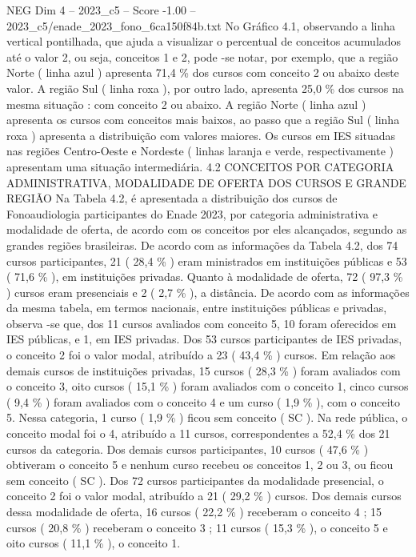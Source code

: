 \begin{textsample}{NEG Dim 4 – 2023\_c5 – Score -1.00 – 2023\_c5/enade\_2023\_fono\_6ca150f84b.txt}
No Gráfico 4.1, observando a linha vertical pontilhada, que ajuda a visualizar o percentual de conceitos acumulados até o valor 2, ou seja, conceitos 1 e 2, pode -se notar, por exemplo, que a região Norte ( linha azul ) apresenta 71,4 \% dos cursos com conceito 2 ou abaixo deste valor.
A região Sul ( linha roxa ), por outro lado, apresenta 25,0 \% dos cursos na mesma situação : com conceito 2 ou abaixo.
A região Norte ( linha azul ) apresenta os cursos com conceitos mais baixos, ao passo que a região Sul ( linha roxa ) apresenta a distribuição com valores maiores.
Os cursos em IES situadas nas regiões Centro-Oeste e Nordeste ( linhas laranja e verde, respectivamente ) apresentam uma situação intermediária. 4.2 CONCEITOS POR CATEGORIA ADMINISTRATIVA, MODALIDADE DE OFERTA DOS CURSOS E GRANDE REGIÃO Na Tabela 4.2, é apresentada a distribuição dos cursos de Fonoaudiologia participantes do Enade 2023, por categoria administrativa e modalidade de oferta, de acordo com os conceitos por eles alcançados, segundo as grandes regiões brasileiras.
De acordo com as informações da Tabela 4.2, dos 74 cursos participantes, 21 ( 28,4 \% ) eram ministrados em instituições públicas e 53 ( 71,6 \% ), em instituições privadas.
Quanto à modalidade de oferta, 72 ( 97,3 \% ) cursos eram presenciais e 2 ( 2,7 \% ), a distância.
De acordo com as informações da mesma tabela, em termos nacionais, entre instituições públicas e privadas, observa -se que, dos 11 cursos avaliados com conceito 5, 10 foram oferecidos em IES públicas, e 1, em IES privadas.
Dos 53 cursos participantes de IES privadas, o conceito 2 foi o valor modal, atribuído a 23 ( 43,4 \% ) cursos.
Em relação aos demais cursos de instituições privadas, 15 cursos ( 28,3 \% ) foram avaliados com o conceito 3, oito cursos ( 15,1 \% ) foram avaliados com o conceito 1, cinco cursos ( 9,4 \% ) foram avaliados com o conceito 4 e um curso ( 1,9 \% ), com o conceito 5.
Nessa categoria, 1 curso ( 1,9 \% ) ficou sem conceito ( SC ).
Na rede pública, o conceito modal foi o 4, atribuído a 11 cursos, correspondentes a 52,4 \% dos 21 cursos da categoria.
Dos demais cursos participantes, 10 cursos ( 47,6 \% ) obtiveram o conceito 5 e nenhum curso recebeu os conceitos 1, 2 ou 3, ou ficou sem conceito ( SC ).
Dos 72 cursos participantes da modalidade presencial, o conceito 2 foi o valor modal, atribuído a 21 ( 29,2 \% ) cursos.
Dos demais cursos dessa modalidade de oferta, 16 cursos ( 22,2 \% ) receberam o conceito 4 ; 15 cursos ( 20,8 \% ) receberam o conceito 3 ; 11 cursos ( 15,3 \% ), o conceito 5 e oito cursos ( 11,1 \% ), o conceito 1.

\end{textsample}
